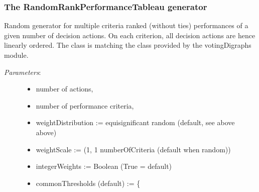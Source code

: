 \documentclass[letterpaper,10pt,english]{sphinxmanual}
\begin{document}
\subsubsection{The RandomRankPerformanceTableau generator}
\label{tutorial:the-randomrankperformancetableau-generator}
Random generator for multiple criteria ranked (without ties) performances of a
given number of decision actions. On each criterion,
all decision actions are hence linearly ordered. The  class is
matching the  class provided by  the votingDigraphs module.
\begin{description}
\item[{\emph{Parameters}:}] \leavevmode\begin{itemize}
\item {} 
number of actions,

\item {} 
number of performance criteria,

\item {} 
weightDistribution := equisignificant \textbar{} random (default, see above above)

\item {} 
weightScale := (1, 1 \textbar{} numberOfCriteria (default when random))

\item {} 
integerWeights := Boolean (True = default)

\item {} \begin{description}
\item[{commonThresholds (default) := \{}] \leavevmode
{}

\end{description}

\end{itemize}

\end{description}
\end{document}
